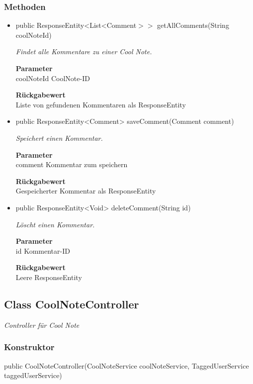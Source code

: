 \documentclass[a4paper]{scrreprt}
\begin{document}
    \subsubsection{Methoden}
    \begin{itemize}
    	\item{public ResponseEntity<List<Comment$>>$ getAllComments(String coolNoteId)}
    	
    	\textit{Findet alle Kommentare zu einer Cool Note.}
    	
    	\textbf{Parameter} \\
    	coolNoteId CoolNote-ID
    	
    	\textbf{Rückgabewert} \\
    	Liste von gefundenen Kommentaren als ResponseEntity        \item{public ResponseEntity<Comment> saveComment(Comment comment)}
    	
    	\textit{Speichert einen Kommentar.}
    	
    	\textbf{Parameter} \\
    	comment Kommentar zum speichern
    	
    	\textbf{Rückgabewert} \\
    	Gespeicherter Kommentar als ResponseEntity        \item{public ResponseEntity<Void> deleteComment(String id)}
    	
    	\textit{Löscht einen Kommentar.}
    	
    	\textbf{Parameter} \\
    	id Kommentar-ID
    	
    	\textbf{Rückgabewert} \\
    	Leere ResponseEntity
    \end{itemize}
    \subsection{Class CoolNoteController}
    \textit{Controller für Cool Note}
    \subsubsection{Konstruktor}
    public CoolNoteController(CoolNoteService coolNoteService, TaggedUserService taggedUserService)
\end{document}
